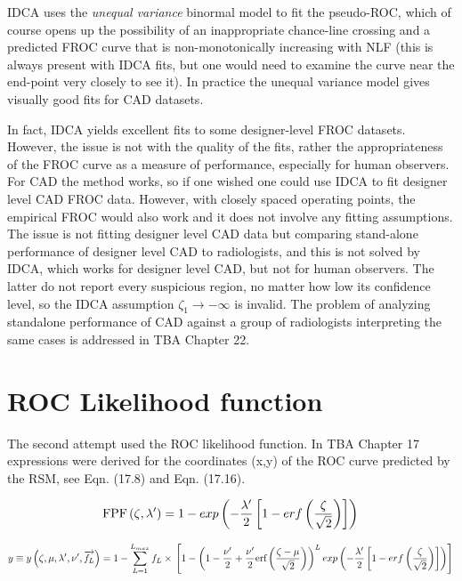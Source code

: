 \documentclass[
]{book}
\begin{document}
IDCA uses the \emph{unequal variance} binormal model to fit the pseudo-ROC, which of course opens up the possibility of an inappropriate chance-line crossing and a predicted FROC curve that is non-monotonically increasing with NLF (this is always present with IDCA fits, but one would need to examine the curve near the end-point very closely to see it). In practice the unequal variance model gives visually good fits for CAD datasets.

In fact, IDCA yields excellent fits to some designer-level FROC datasets. However, the issue is not with the quality of the fits, rather the appropriateness of the FROC curve as a measure of performance, especially for human observers. For CAD the method works, so if one wished one could use IDCA to fit designer level CAD FROC data. However, with closely spaced operating points, the empirical FROC would also work and it does not involve any fitting assumptions. The issue is not fitting designer level CAD data but comparing stand-alone performance of designer level CAD to radiologists, and this is not solved by IDCA, which works for designer level CAD, but not for human observers. The latter do not report every suspicious region, no matter how low its confidence level, so the IDCA assumption \(\zeta_1 \rightarrow -\infty\) is invalid. The problem of analyzing standalone performance of CAD against a group of radiologists interpreting the same cases is addressed in TBA Chapter 22.

\hypertarget{rsm-fitting-roc-likelihood}{%
\section{ROC Likelihood function}\label{rsm-fitting-roc-likelihood}}

The second attempt used the ROC likelihood function. In TBA Chapter 17 expressions were derived for the coordinates (x,y) of the ROC curve predicted by the RSM, see Eqn. (17.8) and Eqn. (17.16).

\begin{equation}
\text{FPF}\left (\zeta , \lambda'\right ) = 1 - exp\left ( -\frac{\lambda'}{2} \left [ 1-erf\left ( \frac{\zeta}{\sqrt{2}} \right ) \right ]  \right )\\ \label{eq:rsm-fitting-roc-x}
\end{equation}

\begin{equation}
y \equiv y\left (\zeta , \mu, \lambda', \nu', \overrightarrow{f_L} \right ) = 1 - \sum_{L=1}^{L_{max}} f_L \times \\
\left [ 1 - \left ( 1 - \frac{\nu'}{2} + \frac{\nu'}{2} \text{erf} \left ( \frac{\zeta - \mu}{\sqrt{2}} \right ) \right )^L exp\left ( -\frac{\lambda'}{2} \left [ 1-erf\left ( \frac{\zeta}{\sqrt{2}} \right ) \right ]  \right ) \right ]\\
\label{eq:rsm-fitting-roc-y}
\end{equation}
\end{document}
